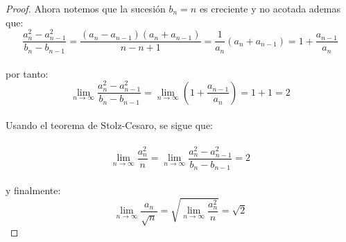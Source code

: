 \documentclass[11pt]{article}
\begin{document}
\begin{proof}
 Ahora notemos que la sucesi\'on $b_n=n$ es creciente y no acotada ademas que:\,\\
   \begin{equation*}
    \frac{a^2_{n}-a^2_{n-1}}{b_n-b_{n-1}}=\frac{(a_{n}-a_{n-1})(a_n+a_{n-1})}{n-n+1}=\frac{1}{a_n}(a_n+a_{n-1})=1+\frac{a_{n-1}}{a_n}
   \end{equation*}\,\\
   por tanto:\,\\
   \begin{equation*}
    \lim_{n\to\infty}\frac{a^2_{n}-a^2_{n-1}}{b_n-b_{n-1}}=\lim_{n\to\infty}\left(1+\frac{a_{n-1}}{a_n}\right)=1+1=2
   \end{equation*}\,\\
   Usando el teorema de Stolz-Cesaro, se sigue que:\,\\
   \,\\
   \begin{equation*}
    \lim_{n\to\infty}\frac{a^2_n}{n}=\lim_{n\to\infty}\frac{a^2_n-a^2_{n-1}}{b_n-b_{n-1}}=2
   \end{equation*}\,\\
   y finalmente:\,\\
   \begin{equation*}
    \lim_{n\to\infty}\frac{a_n}{\sqrt{n}}=\sqrt{\lim_{n\to\infty}\frac{a^2_n}{n}}=\sqrt{2}
   \end{equation*}
\end{proof}
\end{document}

